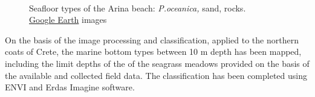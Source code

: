 \documentclass[10pt, a4paper]{article}
\begin{document}
\begin{figure}
	\centering
	\\
	\caption{Seafloor types of the Arina beach: \textit{P.oceanica,} sand, rocks. \\ \href{http://www.google.com/earth/index.html}{Google Earth} images}
	\label{fig:38}
\end{figure}

On the basis of the image processing and classification, applied to the northern coats of Crete, the
marine bottom types between 10 m depth has been mapped, including the limit depths of the of the
seagrass meadows provided on the basis of the available and collected field data. The classification
has been completed using ENVI and Erdas Imagine software.
\end{document}
